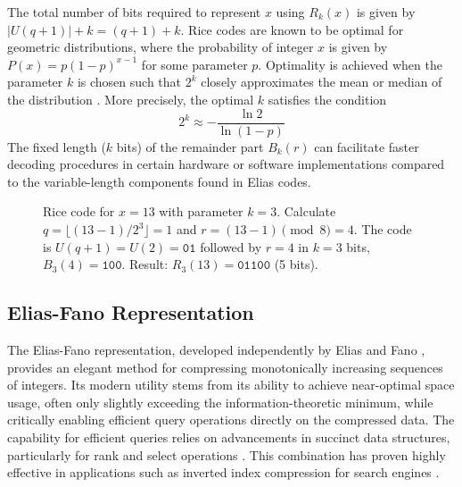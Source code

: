 The total number of bits required to represent $x$ using $R_k(x)$ is given by $|U(q+1)| + k = (q+1) + k$. Rice codes are known to be optimal for geometric distributions, where the probability of integer $x$ is given by $P(x) = p(1-p)^{x-1}$ for some parameter $p$. Optimality is achieved when the parameter $k$ is chosen such that $2^k$ closely approximates the mean or median of the distribution \cite{witten1999managing}. More precisely, the optimal $k$ satisfies the condition
\[ 2^k \approx -\frac{\ln 2}{\ln(1-p)} \]
The fixed length ($k$ bits) of the remainder part $B_k(r)$ can facilitate faster decoding procedures in certain hardware or software implementations compared to the variable-length components found in Elias codes.

\begin{figure}[hbtp]
    \centering
    \caption{Rice code for $x=13$ with parameter $k=3$. Calculate $q = \lfloor (13-1) / 2^3 \rfloor = 1$ and $r = (13-1) \pmod 8 = 4$. The code is $U(q+1)=U(2)=\texttt{01}$ followed by $r=4$ in $k=3$ bits, $B_3(4)=\texttt{100}$. Result: $R_3(13)=\texttt{01100}$ (5 bits).}
    \label{fig:rice_code_example}
\end{figure}

\subsection{Elias-Fano Representation} \label{sec:elias_fano_code}

The Elias-Fano representation, developed independently by Elias \cite{Elias1975} and Fano \cite{Fano1971}, provides an elegant method for compressing monotonically increasing sequences of integers. Its modern utility stems from its ability to achieve near-optimal space usage, often only slightly exceeding the information-theoretic minimum, while critically enabling efficient query operations directly on the compressed data. The capability for efficient queries relies on advancements in succinct data structures, particularly for rank and select operations \cite{sadakane2006squeezing}. This combination has proven highly effective in applications such as inverted index compression for search engines \cite{vigna2013quasi, EFVenturini2014}.

